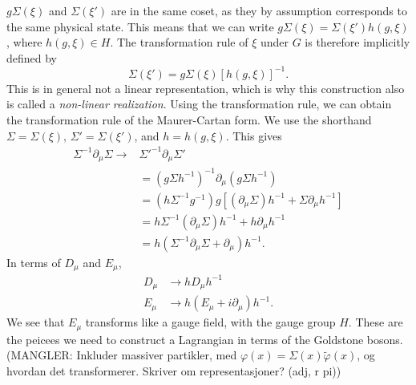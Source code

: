 $g\Sigma(\xi)$ and $\Sigma(\xi')$ are in the same coset, as they by assumption corresponds to the same physical state.
This means that we can write $g\Sigma(\xi) = \Sigma(\xi') h(g, \xi)$, where $h(g, \xi) \in H$.
The transformation rule of $\xi$ under $G$ is therefore implicitly defined by
\begin{equation}
    \Sigma(\xi') = g \Sigma(\xi) [h(g, \xi)]^{-1}.
\end{equation}
This is in general not a linear representation, which is why this construction also is called a \emph{non-linear realization}.
Using the transformation rule, we can obtain the transformation rule of the Maurer-Cartan form.
We use the shorthand $\Sigma = \Sigma(\xi),\, \Sigma' = \Sigma(\xi')$, and $h = h(g, \xi)$.
This gives
\begin{align*}
    \Sigma^{-1} \partial_\mu \Sigma
    \rightarrow 
    & \Sigma'^{-1} \partial_\mu \Sigma' \\
    & = (g \Sigma h^{-1})^{-1} \partial_\mu (g \Sigma h^{-1}) \\
    & = (h \Sigma^{-1} g^{-1}) g [(\partial_\mu \Sigma)h^{-1} + \Sigma \partial_\mu h^{-1}] \\
    & = h \Sigma^{-1} (\partial_\mu \Sigma) h^{-1}
    + h \partial_\mu h^{-1} \\
    & = h (\Sigma^{-1} \partial_\mu \Sigma + \partial_\mu) h^{-1}.
\end{align*}
In terms of $D_\mu$ and $E_\mu$,
\begin{align}
    D_\mu & \rightarrow h D_\mu h^{-1} \\
    E_\mu & \rightarrow h (E_\mu + i\partial_\mu )h^{-1}.
\end{align}
We see that $E_\mu$ transforms like a gauge field, with the gauge group $H$.
These are the peicees we need to construct a Lagrangian in terms of the Goldstone bosons.
(MANGLER: Inkluder massiver partikler, med $\varphi(x) = \Sigma(x)\tilde \varphi(x)$, og hvordan det transformerer. Skriver om representasjoner? (adj, r pi))
